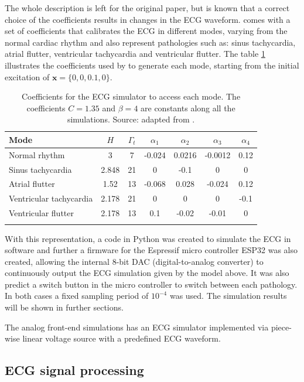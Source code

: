 The whole description is left for the original paper, but is known that a correct choice of the coefficients results in changes in the ECG waveform. \textcite{quiroz2019generation} comes with a set of coefficients that calibrates the ECG in different modes, varying from the normal cardiac rhythm and also represent pathologies such as: sinus tachycardia, atrial flutter, ventricular tachycardia and ventricular flutter. The table \ref{tbl:5} illustrates the coefficients used by \textcite{quiroz2019generation} to generate each mode, starting from the initial excitation of $\textbf{x} = \{0, 0, 0.1, 0\}$.

\begin{longtable}[H]{lcccccc}

\toprule
Mode & $H$ & $\Gamma_t$ & $\alpha_1$ & $\alpha_2$ & $\alpha_3$ & $\alpha_4$\\
\midrule
\endhead
Normal rhythm & 3 & 7 & -0.024 & 0.0216 & -0.0012 & 0.12 \\
Sinus tachycardia & 2.848 & 21 & 0 & -0.1 & 0 & 0 \\
Atrial flutter & 1.52 & 13 & -0.068 & 0.028 & -0.024 & 0.12 \\
Ventricular tachycardia & 2.178 & 21 & 0 & 0 & 0 & -0.1 \\
Ventricular flutter & 2.178 & 13 & 0.1 & -0.02 & -0.01 & 0 \\
\bottomrule
\caption{Coefficients for the ECG simulator to access each mode. The coefficients $C=1.35$ and $\beta=4$ are constants along all the simulations. Source: adapted from \textcite{quiroz2019generation}.}
\label{tbl:5}
\end{longtable}

With this representation, a code in Python was created to simulate the ECG in software and further a firmware for the Espressif micro controller ESP32 was also created, allowing the internal 8-bit DAC (digital-to-analog converter) to continuously output the ECG simulation given by the model above. It was also predict a switch button in the micro controller to switch between each pathology. In both cases a fixed sampling period of $10^{-4}$ was used. The simulation results will be shown in further sections.

The analog front-end simulations has an ECG simulator implemented via piece-wise linear voltage source with a predefined ECG waveform.

\subsection{ECG signal processing}

